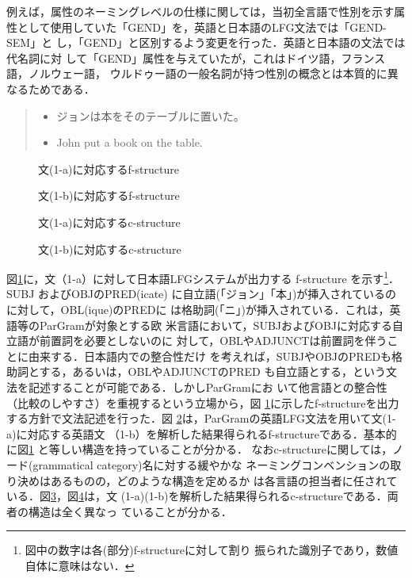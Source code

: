 例えば，属性のネーミングレベルの仕様に関しては，当初全言語で性別を示す属
性として使用していた「GEND」を，英語と日本語のLFG文法では「GEND-SEM」と
し，「GEND」と区別するよう変更を行った．英語と日本語の文法では代名詞に対
して「GEND」属性を与えていたが，これはドイツ語，フランス語，ノルウェー語，
ウルドゥー語の一般名詞が持つ性別の概念とは本質的に異なるためである．

\begin{quote}
\begin{itemize}
\item[(1-a)] ジョンは本をそのテーブルに置いた。
\item[(1-b)] John put a book on the table.
\end{itemize}
\end{quote}

\begin{figure}[htbp]
\center 
\epsfxsize=90.59mm
\caption{文(1-a)に対応するf-structure}
\label{fig2-1jp}
\end{figure}

\begin{figure}[htbp]
\center
\epsfxsize=89.32mm
\caption{文(1-b)に対応するf-structure}
\label{fig2-1eng}
\end{figure}

\begin{figure}[htbp]
\center
\epsfxsize=115.35mm
\caption{文(1-a)に対応するc-structure}
\label{fig2-2jp}
\end{figure}

\begin{figure}[htbp]
\center
\epsfxsize=53.97mm
\caption{文(1-b)に対応するc-structure}
\label{fig2-2eng}
\end{figure}

図\ref{fig2-1jp}に，文（1-a）に対して日本語LFGシステムが出力する
f-structure を示す\footnote{図中の数字は各(部分)f-structureに対して割り
振られた識別子であり，数値自体に意味はない．}．SUBJ およびOBJのPRED(icate) 
に自立語(「ジョン」「本」)が挿入されているのに対して，OBL(ique)のPREDに
は格助詞(「ニ」)が挿入されている．これは，英語等のParGramが対象とする欧
米言語において，SUBJおよびOBJに対応する自立語が前置詞を必要としないのに
対して，OBLやADJUNCTは前置詞を伴うことに由来する．日本語内での整合性だけ
を考えれば，SUBJやOBJのPREDも格助詞とする，あるいは，OBLやADJUNCTのPRED 
も自立語とする，という文法を記述することが可能である．しかしParGramにお
いて他言語との整合性（比較のしやすさ）を重視するという立場から，図
\ref{fig2-1jp}に示したf-structureを出力する方針で文法記述を行った．図
\ref{fig2-1eng}は，ParGramの英語LFG文法を用いて文(1-a)に対応する英語文
（1-b）を解析した結果得られるf-structureである．基本的に図\ref{fig2-1jp} 
と等しい構造を持っていることが分かる．
なおc-structureに関しては，ノード(grammatical category)名に対する緩やかな
ネーミングコンベンションの取り決めはあるものの，どのような構造を定めるか
は各言語の担当者に任されている．図\ref{fig2-2jp}，図\ref{fig2-2eng}は，文
(1-a)(1-b)を解析した結果得られるc-structureである．両者の構造は全く異なっ
ていることが分かる．

